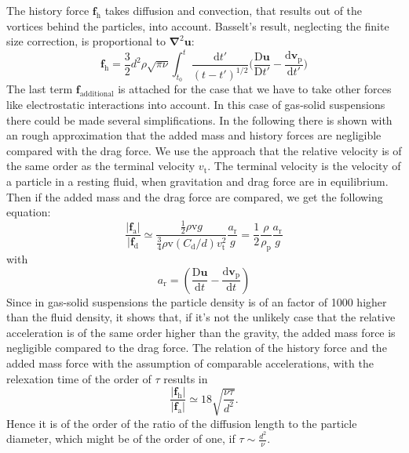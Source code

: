 \documentclass[11pt,a4paper,openany,oneside,parskip=half*]{article}
\renewcommand*\vec[1]{\boldsymbol{#1}}
\begin{document}
The history force $\vec{f}_\mathrm{h}$ takes diffusion and convection, that results out of the vortices behind the particles, into account. Basselt's result, neglecting the finite size correction, is proportional to $\vec\nabla^\mathrm{2}\vec{u}$:
\begin{equation}
\vec{f}_\mathrm{h} = \frac{3}{2}d^\mathrm{2}\rho\sqrt{\pi\nu}\int_{t_\mathrm{0}}^{t} \frac{\mathrm{d}t'}{(t-t')^\mathrm{1/2}} \biggl(\frac{\mathrm{D}\vec{u}}{\mathrm{D}t'}- \frac{\mathrm{d}\vec{v}_\mathrm{p}}{\mathrm{d}t'}\biggl)  
\end{equation}
The last term $\vec{f}_\mathrm{additional}$ is attached for the case that we have to take other forces like electrostatic interactions into account.
In this case of gas-solid suspensions there could be made several simplifications.
In the following there is shown with an rough approximation that the added mass and history forces are negligible compared with the drag force.
We use the approach that the relative velocity is of the same order as the terminal velocity $v_\mathrm{t}$. The terminal velocity is the velocity of a particle in a resting fluid, when gravitation and drag force are in equilibrium. Then if the added mass and the drag force are compared, we get the following equation:
\begin{equation}
\frac{|\vec{f}_\mathrm{a}|}{|\vec{f}_\mathrm{d}} \simeq \frac{\frac{1}{2} \rho \mathrm{v} g}{\frac{3}{4} \rho \mathrm{v}(C_\mathrm{d}/d) v_\mathrm{t}^\mathrm{2}}\frac{a_\mathrm{r}}{g} = \frac{1}{2}\frac{\rho}{\rho_\mathrm{p}}\frac{a_\mathrm{r}}{g}
\end{equation}
with 
\begin{equation}
a_\mathrm{r}=(\frac{\mathrm{D}\vec{u}}{\mathrm{d}t}-\frac{\mathrm{d}\vec{v}_\mathrm{p}}{\mathrm{d}t})
\end{equation}
Since in gas-solid suspensions the particle density is of an factor of 1000 higher than the fluid density, it shows that, if it's not the unlikely case that the relative acceleration is of the same order higher than the gravity, the added mass force is negligible compared to the drag force.
The relation of the history force and the added mass force with the assumption of comparable accelerations, with the relexation time of the order of $\tau$ results in
\begin {equation}
\frac{|\vec{f}_\mathrm{h}|}{|\vec{f}_\mathrm{a}|}\simeq 18 \sqrt{\frac{\nu\tau}{d^\mathrm{2}}}.
\end{equation}
Hence it is of the order of the ratio of the diffusion length to the particle diameter, which might be of the order of one, if $\tau \sim \frac{d^\mathrm{2}}{\nu}$.
\end{document}

